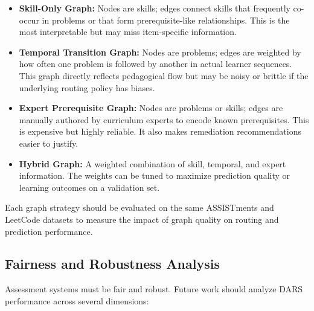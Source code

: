 \documentclass[conference]{IEEEtran}
\begin{document}
\begin{itemize}
    \item \textbf{Skill-Only Graph:} Nodes are skills; edges connect skills that frequently co-occur in problems or that form prerequisite-like relationships. This is the most interpretable but may miss item-specific information.
    
    \item \textbf{Temporal Transition Graph:} Nodes are problems; edges are weighted by how often one problem is followed by another in actual learner sequences. This graph directly reflects pedagogical flow but may be noisy or brittle if the underlying routing policy has biases.
    
    \item \textbf{Expert Prerequisite Graph:} Nodes are problems or skills; edges are manually authored by curriculum experts to encode known prerequisites. This is expensive but highly reliable. It also makes remediation recommendations easier to justify.
    
    \item \textbf{Hybrid Graph:} A weighted combination of skill, temporal, and expert information. The weights can be tuned to maximize prediction quality or learning outcomes on a validation set.
\end{itemize}

Each graph strategy should be evaluated on the same ASSISTments and LeetCode datasets to measure the impact of graph quality on routing and prediction performance.

\subsection{Fairness and Robustness Analysis}
Assessment systems must be fair and robust. Future work should analyze DARS performance across several dimensions:
\end{document}
